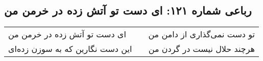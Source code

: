\begin{center}
\section*{رباعی شماره ۱۲۱: ای دست تو آتش زده در خرمن من}
\label{sec:121}
\begin{longtable}{l p{0.5cm} r}
ای دست تو آتش زده در خرمن من
&&
تو دست نمی‌گذاری از دامن من
\\
این دست نگارین که به سوزن زده‌ای
&&
هرچند حلال نیست در گردن من
\\
\end{longtable}
\end{center}
